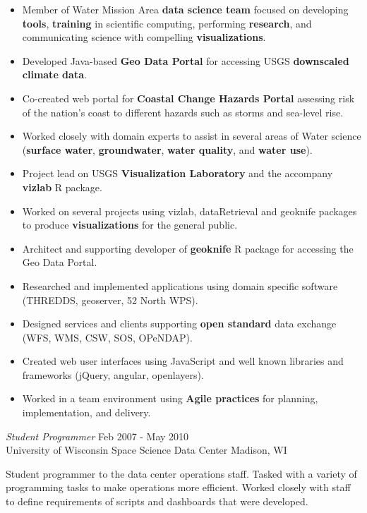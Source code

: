 \documentclass[line,margin]{res}
\begin{document}
\begin{resume}
    \begin{itemize} \itemsep -2pt %
		\item Member of Water Mission Area \textbf{data science team} focused on developing \textbf{tools}, \textbf{training} in scientific computing, performing \textbf{research}, and communicating science with compelling \textbf{visualizations}.
		\item Developed Java-based \textbf{Geo Data Portal} for accessing USGS \textbf{downscaled climate data}.
		\item Co-created web portal for \textbf{Coastal Change Hazards Portal} assessing risk of the nation's coast to different hazards such as storms and sea-level rise.
		\item Worked closely with domain experts to assist in several areas of Water science (\textbf{surface water}, \textbf{groundwater}, \textbf{water quality}, and \textbf{water use}).
		\item Project lead on USGS \textbf{Visualization Laboratory} and the accompany \textbf{vizlab} R package.
		\item Worked on several projects using vizlab, dataRetrieval and geoknife packages to produce \textbf{visualizations} for the general public.
		\item Architect and supporting developer of \textbf{geoknife} R package for accessing the Geo Data Portal.
		\item Researched and implemented applications using domain specific software (THREDDS, geoserver, 52 North WPS).
		\item Designed services and clients supporting \textbf{open standard} data exchange (WFS, WMS, CSW, SOS, OPeNDAP).
		\item Created web user interfaces using JavaScript and well known libraries and frameworks (jQuery, angular, openlayers).
		\item Worked in a team environment using \textbf{Agile practices} for planning, implementation, and delivery.
     \end{itemize}

	{\sl Student Programmer} \hfill Feb 2007 - May 2010 \\
	University of Wisconsin Space Science Data Center \hfill Madison, WI
                
	Student programmer to the data center operations staff.  Tasked with a variety of programming tasks to make operations more efficient.  Worked closely with staff to define requirements of scripts and dashboards that were developed.


\end{resume}
\end{document}
